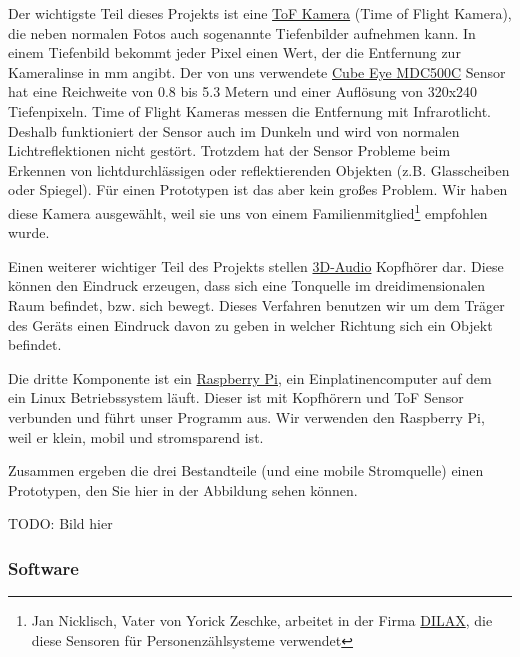 \documentclass[a4paper,12pt,ngerman]{scrartcl}
\begin{document}
Der wichtigste Teil dieses Projekts ist eine \href{https://de.wikipedia.org/wiki/TOF-Kamera}
{ToF Kamera} (Time of Flight Kamera), die neben normalen Fotos auch sogenannte Tiefenbilder aufnehmen kann.
In einem Tiefenbild bekommt jeder Pixel einen Wert, der die Entfernung zur Kameralinse in mm angibt.
Der von uns verwendete \href{http://www.cube-eye.co.kr/en/#/spec/product_MDC500d.html}{Cube Eye MDC500C}
Sensor hat eine Reichweite von 0.8 bis 5.3 Metern und einer Auflösung von 320x240 Tiefenpixeln. 
Time of Flight Kameras messen die Entfernung mit Infrarotlicht. Deshalb funktioniert der Sensor auch 
im Dunkeln und wird von normalen Lichtreflektionen nicht gestört. Trotzdem hat der Sensor Probleme beim
Erkennen von lichtdurchlässigen oder reflektierenden Objekten (z.B. Glasscheiben oder Spiegel). Für einen
Prototypen ist das aber kein großes Problem. Wir haben diese Kamera ausgewählt, weil sie uns von einem 
Familienmitglied\footnote{Jan Nicklisch, Vater von Yorick Zeschke, arbeitet in der Firma
\href{https://www.dilax.com/de/}{DILAX}, die diese Sensoren für Personenzählsysteme verwendet} 
empfohlen wurde.\par
Einen weiterer wichtiger Teil des Projekts stellen \href{https://en.wikipedia.org/wiki/3D_audio_effect}
{3D-Audio} Kopfhörer dar. Diese können den Eindruck erzeugen, dass sich eine Tonquelle im dreidimensionalen
Raum befindet, bzw. sich bewegt. Dieses Verfahren benutzen wir um dem Träger des Geräts einen Eindruck
davon zu geben in welcher Richtung sich ein Objekt befindet.\par 
Die dritte Komponente ist ein \href{https://de.wikipedia.org/wiki/Raspberry_Pi}{Raspberry Pi}, ein 
Einplatinencomputer auf dem ein Linux Betriebssystem läuft. Dieser ist mit Kopfhörern und ToF Sensor 
verbunden und führt unser Programm aus. Wir verwenden den Raspberry Pi, weil er klein, mobil und 
stromsparend ist.\par 
Zusammen ergeben die drei Bestandteile (und eine mobile Stromquelle) einen Prototypen, den Sie hier 
in der Abbildung sehen können.
\par 
TODO: Bild hier 

\subsubsection{Software}
\end{document}
